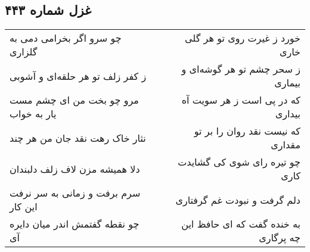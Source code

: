 \begin{center}
\section*{غزل شماره ۴۴۳}
\label{sec:sh443}
\begin{longtable}{l p{0.5cm} r}
چو سرو اگر بخرامی دمی به گلزاری
&&
خورد ز غیرت روی تو هر گلی خاری
\\
ز کفر زلف تو هر حلقه‌ای و آشوبی
&&
ز سحر چشم تو هر گوشه‌ای و بیماری
\\
مرو چو بخت من ای چشم مست یار به خواب
&&
که در پی است ز هر سویت آه بیداری
\\
نثار خاک رهت نقد جان من هر چند
&&
که نیست نقد روان را بر تو مقداری
\\
دلا همیشه مزن لاف زلف دلبندان
&&
چو تیره رای شوی کی گشایدت کاری
\\
سرم برفت و زمانی به سر نرفت این کار
&&
دلم گرفت و نبودت غم گرفتاری
\\
چو نقطه گفتمش اندر میان دایره آی
&&
به خنده گفت که ای حافظ این چه پرگاری
\\
\end{longtable}
\end{center}

